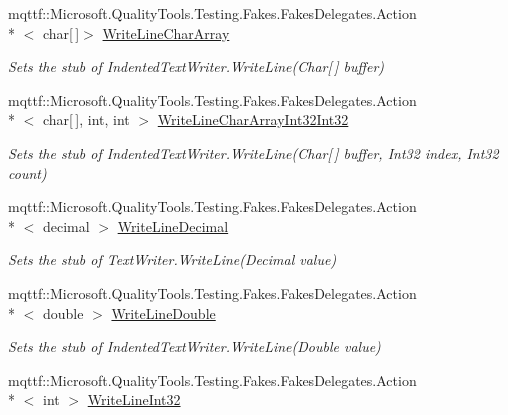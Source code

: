 \begin{DoxyCompactItemize}
mqttf\-::\-Microsoft.\-Quality\-Tools.\-Testing.\-Fakes.\-Fakes\-Delegates.\-Action\\*
$<$ char\mbox{[}$\,$\mbox{]}$>$ \hyperlink{class_system_1_1_code_dom_1_1_compiler_1_1_fakes_1_1_stub_indented_text_writer_adfb2355de3485238791d3398e1f61f48}{Write\-Line\-Char\-Array}
\begin{DoxyCompactList}\small\item\em Sets the stub of Indented\-Text\-Writer.\-Write\-Line(\-Char\mbox{[}$\,$\mbox{]} buffer)\end{DoxyCompactList}\item 
mqttf\-::\-Microsoft.\-Quality\-Tools.\-Testing.\-Fakes.\-Fakes\-Delegates.\-Action\\*
$<$ char\mbox{[}$\,$\mbox{]}, int, int $>$ \hyperlink{class_system_1_1_code_dom_1_1_compiler_1_1_fakes_1_1_stub_indented_text_writer_a6f50babb5e7cb650c2add884a2e142c2}{Write\-Line\-Char\-Array\-Int32\-Int32}
\begin{DoxyCompactList}\small\item\em Sets the stub of Indented\-Text\-Writer.\-Write\-Line(\-Char\mbox{[}$\,$\mbox{]} buffer, Int32 index, Int32 count)\end{DoxyCompactList}\item 
mqttf\-::\-Microsoft.\-Quality\-Tools.\-Testing.\-Fakes.\-Fakes\-Delegates.\-Action\\*
$<$ decimal $>$ \hyperlink{class_system_1_1_code_dom_1_1_compiler_1_1_fakes_1_1_stub_indented_text_writer_a139f6d338011e291abce022932196d7f}{Write\-Line\-Decimal}
\begin{DoxyCompactList}\small\item\em Sets the stub of Text\-Writer.\-Write\-Line(\-Decimal value)\end{DoxyCompactList}\item 
mqttf\-::\-Microsoft.\-Quality\-Tools.\-Testing.\-Fakes.\-Fakes\-Delegates.\-Action\\*
$<$ double $>$ \hyperlink{class_system_1_1_code_dom_1_1_compiler_1_1_fakes_1_1_stub_indented_text_writer_aa0f42fd4fe39c21689ee0cbb76351f03}{Write\-Line\-Double}
\begin{DoxyCompactList}\small\item\em Sets the stub of Indented\-Text\-Writer.\-Write\-Line(\-Double value)\end{DoxyCompactList}\item 
mqttf\-::\-Microsoft.\-Quality\-Tools.\-Testing.\-Fakes.\-Fakes\-Delegates.\-Action\\*
$<$ int $>$ \hyperlink{class_system_1_1_code_dom_1_1_compiler_1_1_fakes_1_1_stub_indented_text_writer_a28e9da92eeacacadeab2956897a8fe25}{Write\-Line\-Int32}

\end{DoxyCompactItemize}
